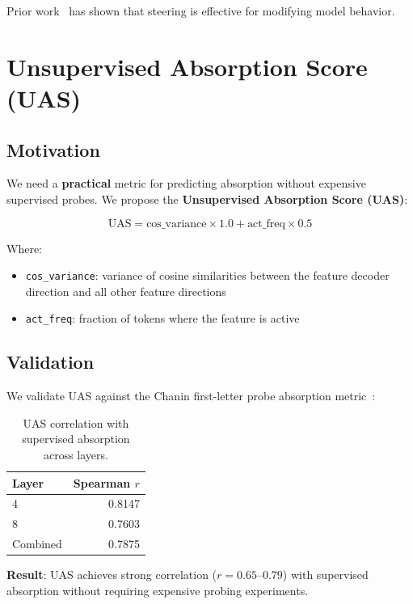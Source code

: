 \documentclass{article}
\begin{document}
Prior work~\citep{subramani2022steering, zou2023representation} has shown that steering is effective for modifying model behavior.


\section{Unsupervised Absorption Score (UAS)}

\subsection{Motivation}

We need a \textbf{practical} metric for predicting absorption without expensive supervised probes. We propose the \textbf{Unsupervised Absorption Score (UAS)}:

\begin{equation}
\text{UAS} = \text{cos\_variance} \times 1.0 + \text{act\_freq} \times 0.5
\end{equation}

Where:
\begin{itemize}
    \item \texttt{cos\_variance}: variance of cosine similarities between the feature decoder direction and all other feature directions
    \item \texttt{act\_freq}: fraction of tokens where the feature is active
\end{itemize}

\subsection{Validation}

We validate UAS against the Chanin first-letter probe absorption metric~\citep{chanin2024spectral}:

\begin{table}[t]
\caption{UAS correlation with supervised absorption across layers.}
\label{tab:uas-validation}
\centering
\begin{tabular}{lr}
\toprule
Layer & Spearman $r$ \\
\midrule
4 & 0.8147 \\
8 & 0.7603 \\
Combined & 0.7875 \\
\bottomrule
\end{tabular}
\end{table}

\textbf{Result}: UAS achieves strong correlation ($r=0.65\text{--}0.79$) with supervised absorption without requiring expensive probing experiments.
\end{document}
